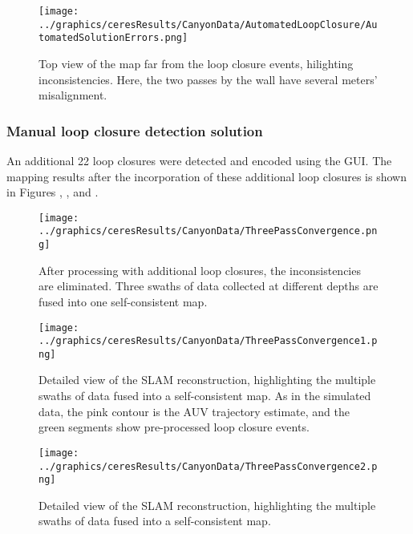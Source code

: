  \begin{figure}[!htb]
   \centering
   \texttt{[image: ../graphics/ceresResults/CanyonData/AutomatedLoopClosure/AutomatedSolutionErrors.png]} %
   \caption{Top view of the map far from the loop closure events, hilighting inconsistencies. Here, the two passes by the wall have several meters' misalignment.}
   \label{fig:AutoSol2}
\end{figure}


\subsubsection{Manual loop closure detection solution}

An additional 22 loop closures were detected and encoded using the GUI. The mapping results after the incorporation of these additional loop closures is shown in Figures \label{fig:RealDataSolution1}, \label{fig:RealDataSolution2}, and \label{fig:RealDataSolution3}.

 \begin{figure}[!htb]
   \centering
   \texttt{[image: ../graphics/ceresResults/CanyonData/ThreePassConvergence.png]} %
   \caption{After processing with additional loop closures, the inconsistencies are eliminated. Three swaths of data collected at different depths are fused into one self-consistent map. }
   \label{fig:RealDataSolution1}
\end{figure}

 \begin{figure}[!htb]
   \centering
   \texttt{[image: ../graphics/ceresResults/CanyonData/ThreePassConvergence1.png]} %
   \caption{Detailed view of the SLAM reconstruction, highlighting the multiple swaths of data fused into a self-consistent map. As in the simulated data, the pink contour is the AUV trajectory estimate, and the green segments show pre-processed loop closure events. }
   \label{fig:RealDataSolution2}
\end{figure}

 \begin{figure}[!htb]
   \centering
   \texttt{[image: ../graphics/ceresResults/CanyonData/ThreePassConvergence2.png]} %
   \caption{Detailed view of the SLAM reconstruction, highlighting the multiple swaths of data fused into a self-consistent map. }
   \label{fig:RealDataSolution3}
\end{figure}


